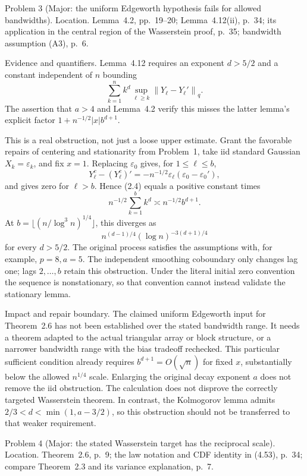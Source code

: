 \documentclass[10pt]{article}
\begin{document}
Problem 3 (Major: the uniform Edgeworth hypothesis fails for allowed bandwidths).  Location. Lemma 4.2, pp. 19–20; Lemma 4.12(ii), p. 34; its application in the central region of the Wasserstein proof, p. 35; bandwidth assumption (A3), p. 6.\par
Evidence and quantifiers. Lemma 4.12 requires an exponent \(d>5/2\) and a constant independent of \(n\) bounding \[\sum_{k=1}^n k^d\sup_{\ell\ge k}\left\|Y_\ell-Y_\ell'\right\|_q .
                                                                    \tag{2.4}\] The assertion that \(a>4\) and Lemma 4.2 verify this misses the latter lemma’s explicit factor \(1+n^{-1/2}|x|b^{d+1}\).\par
This is a real obstruction, not just a loose upper estimate. Grant the favorable repairs of centering and stationarity from Problem 1, take iid standard Gaussian \(X_k=\varepsilon_k\), and fix \(x=1\). Replacing \(\varepsilon_0\) gives, for \(1\le\ell\le b\), \[Y_\ell^c-(Y_\ell^c)'=-n^{-1/2}\varepsilon_\ell
                        (\varepsilon_0-\varepsilon_0'),\] and gives zero for \(\ell>b\). Hence (2.4) equals a positive constant times \[n^{-1/2}\sum_{k=1}^b k^d\asymp n^{-1/2}b^{d+1}.\] At \(b=\lfloor(n/\log^3n)^{1/4}\rfloor\), this diverges as \[n^{(d-1)/4}(\log n)^{-3(d+1)/4}\] for every \(d>5/2\). The original process satisfies the assumptions with, for example, \(p=8,a=5\). The independent smoothing coboundary only changes lag one; lags \(2,\ldots,b\) retain this obstruction. Under the literal initial zero convention the sequence is nonstationary, so that convention cannot instead validate the stationary lemma.\par
Impact and repair boundary. The claimed uniform Edgeworth input for Theorem 2.6 has not been established over the stated bandwidth range. It needs a theorem adapted to the actual triangular array or block structure, or a narrower bandwidth range with the bias tradeoff rechecked. This particular sufficient condition already requires \(b^{d+1}=O(\sqrt n)\) for fixed \(x\), substantially below the allowed \(n^{1/4}\) scale. Enlarging the original decay exponent \(a\) does not remove the iid obstruction. The calculation does not disprove the correctly targeted Wasserstein theorem. In contrast, the Kolmogorov lemma admits \(2/3<d<\min(1,a-3/2)\), so this obstruction should not be transferred to that weaker requirement.\par
Problem 4 (Major: the stated Wasserstein target has the reciprocal scale).  Location. Theorem 2.6, p. 9; the law notation and CDF identity in (4.53), p. 34; compare Theorem 2.3 and its variance explanation, p. 7.\par
\end{document}
